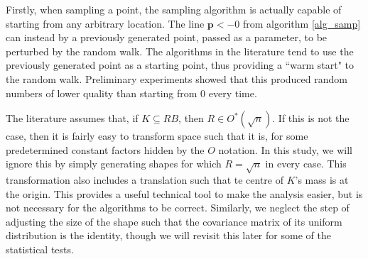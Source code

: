 Firstly, when sampling a point, the sampling algorithm is actually capable of starting from any arbitrary location. The line ${\bm p} <- 0$ from algorithm \ref{alg_samp} can instead by a previously generated point, passed as a parameter, to be perturbed by the random walk. The algorithms in the literature tend to use the previously generated point as a starting point, thus providing a ``warm start" to the random walk. Preliminary experiments showed that this produced random numbers of lower quality than starting from $0$ every time.

The literature assumes that, if $K \subseteq RB$, then $R \in O^{*}(\sqrt{n})$. If this is not the case, then it is fairly easy to transform space such that it is, for some predetermined constant factors hidden by the $O$ notation. In this study, we will ignore this by simply generating shapes for which $R = \sqrt{n}$ in every case. This transformation also includes a translation such that te centre of $K$'s mass is at the origin. This provides a useful technical tool to make the analysis easier, but is not necessary for the algorithms to be correct. Similarly, we neglect the step of adjusting the size of the shape such that the covariance matrix of its uniform distribution is the identity, though we will revisit this later for some of the statistical tests.
